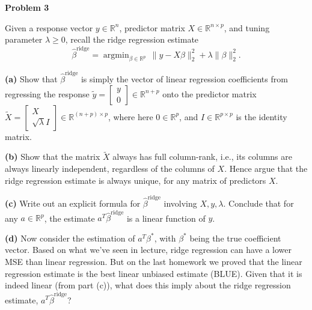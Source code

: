 \documentclass[11pt]{article}
\DeclareMathOperator{\argmin}{argmin}
\newcommand{\R}{\mathbb{R}}
\def\hbeta{\hat{\beta}}
\begin{document}
\bigskip
\bigskip
\noindent
{\bf\large Problem 3}

\smallskip
\noindent
Given a response vector $y\in\R^n$, predictor matrix $X \in \R^{n\times p}$, and tuning
parameter $\lambda \geq 0$, recall the ridge regression estimate
\begin{equation*}
\hbeta^\mathrm{ridge} = 
\argmin_{\beta \in \R^p} \,\|y-X\beta\|_2^2 + \lambda \|\beta\|_2^2.
\end{equation*}

\bigskip
\noindent
{\bf (a)} Show that $\hbeta^\mathrm{ridge}$ is simply the vector of
linear regression coefficients from regressing the response
$\tilde{y}=\left[\begin{array}{c} y \\ 0\end{array}\right] \in \R^{n+p}$
onto the predictor matrix $\tilde{X} = \left[\begin{array}{c} X \\ \sqrt{\lambda}I\end{array}\right]
\in \R^{(n+p)\times p}$, where here $0 \in \R^p$, and $I \in \R^{p\times p}$ is the identity 
matrix.

\bigskip
\noindent
{\bf (b)} Show that the matrix $\tilde{X}$ always has full column-rank, i.e., its columns
are always linearly independent, regardless of the columns of $X$. Hence argue that the
ridge regression estimate is always unique, for any matrix of predictors $X$. 

\bigskip
\noindent
{\bf (c)} Write out an explicit formula for $\hbeta^\mathrm{ridge}$ involving $X,y,\lambda$.
Conclude that for any $a\in\R^p$, the estimate $a^T \hbeta^\mathrm{ridge}$ is a linear function of 
$y$.

\bigskip
\noindent
{\bf (d)} 
Now consider the estimation of $a^T \beta^*$, with $\beta^*$ being the true coefficient vector.
Based on what we've seen in lecture, ridge regression can have a lower MSE than linear regression. 
But on the last homework we proved that the linear regression estimate is the
best linear unbiased estimate (BLUE). Given that it 
is indeed linear (from part (c)), what does this imply about the ridge regression estimate, 
$a^T \hbeta^\mathrm{ridge}$?
\end{document}
